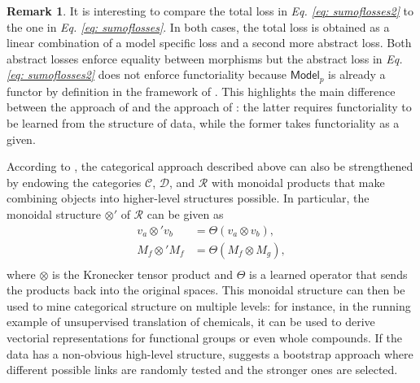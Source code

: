 \documentclass[11pt,a4paper,openright,twoside]{report}
\newcounter{mycounter}
\theoremstyle{plain}
\theoremstyle{definition}
\newtheorem{remark}[mycounter]{Remark}
\begin{document}
\begin{remark}
  It is interesting to compare the total loss in \textit{Eq. \ref{eq: sumoflosses2}} to the one in \textit{Eq. \ref{eq: sumoflosses}}. In both cases, the total loss is obtained as a linear combination of a model specific loss and a second more abstract loss. Both abstract losses enforce equality between morphisms but the abstract loss in \textit{Eq. \ref{eq: sumoflosses2}} does not enforce functoriality because $\mathsf{Model}_p$ is already a functor by definition in the framework of \cite{gavranovic2019compositional}. This highlights the main difference between the approach of \cite{gavranovic2019compositional} and the approach of \cite{sheshmani2021categorical}: the latter requires functoriality to be learned from the structure of data, while the former takes functoriality as a given.
\end{remark}

According to \cite{sheshmani2021categorical}, the categorical approach described above can also be strengthened by endowing the categories $\mathcal{C}$, $\mathcal{D}$, and $\mathcal{R}$ with monoidal products that make combining objects into higher-level structures possible. In particular, the monoidal structure $\otimes'$ of $\mathcal{R}$ can be given as
\begin{align*}
  v_a \otimes' v_b &= \Theta(v_a \otimes v_b),\\
  M_f \otimes' M_f &= \Theta(M_f \otimes M_g),\\
\end{align*}
where $\otimes$ is the Kronecker tensor product and $\Theta$ is a learned operator that sends the products back into the original spaces. This monoidal structure can then be used to mine categorical structure on multiple levels: for instance, in the running example of unsupervised translation of chemicals, it can be used to derive vectorial representations for functional groups or even whole compounds. If the data has a non-obvious high-level structure, \cite{sheshmani2021categorical} suggests a bootstrap approach where different possible links are randomly tested and the stronger ones are selected.
\end{document}

